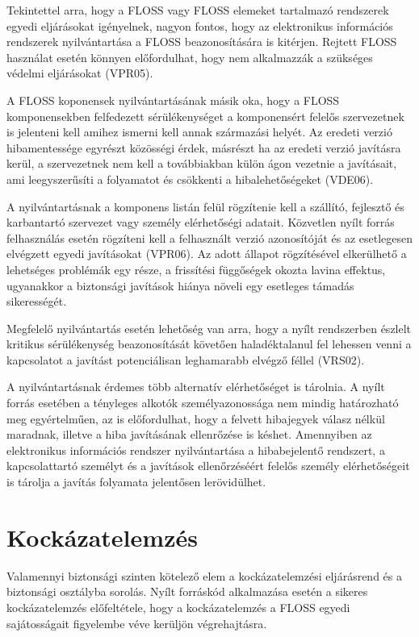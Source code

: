 \documentclass[12pt,magyar,a4paper,oneside]{scrreprt}
\begin{document}
Tekintettel arra, hogy a FLOSS vagy FLOSS elemeket tartalmazó rendszerek
egyedi eljárásokat igényelnek, nagyon fontos, hogy az elektronikus
információs rendszerek nyilvántartása a FLOSS beazonosítására is
kitérjen. Rejtett FLOSS használat esetén könnyen előfordulhat, hogy nem
alkalmazzák a szükséges védelmi eljárásokat (VPR05).

A FLOSS koponensek nyilvántartásának másik oka, hogy a FLOSS
komponensekben felfedezett sérülékenységet a komponensért felelős
szervezetnek is jelenteni kell amihez ismerni kell annak származási
helyét. Az eredeti verzió hibamentessége egyrészt közösségi érdek,
másrészt ha az eredeti verzió javításra kerül, a szervezetnek nem kell a
továbbiakban külön ágon vezetnie a javításait, ami leegyszerűsíti a
folyamatot és csökkenti a hibalehetőségeket (VDE06).

A nyilvántartásnak a komponens listán felül rögzítenie kell a szállító,
fejlesztő és karbantartó szervezet vagy személy elérhetőségi adatait.
Közvetlen nyílt forrás felhasználás esetén rögzíteni kell a felhasznált
verzió azonosítóját és az esetlegesen elvégzett egyedi javításokat
(VPR06). Az adott állapot rögzítésével elkerülhető a lehetséges
problémák egy része, a frissítési függőségek okozta lavina effektus,
ugyanakkor a biztonsági javítások hiánya növeli egy esetleges támadás
sikerességét.

Megfelelő nyilvántartás esetén lehetőség van arra, hogy a nyílt
rendszerben észlelt kritikus sérülékenység beazonosítását követően
haladéktalanul fel lehessen venni a kapcsolatot a javítást potenciálisan
leghamarabb elvégző féllel (VRS02).

A nyilvántartásnak érdemes több alternatív elérhetőséget is tárolnia. A
nyílt forrás esetében a tényleges alkotók személyazonossága nem mindig
határozható meg egyértelműen, az is előfordulhat, hogy a felvett
hibajegyek válasz nélkül maradnak, illetve a hiba javításának
ellenrőzése is késhet. Amennyiben az elektronikus információs rendszer
nyilvántartása a hibabejelentő rendszert, a kapcsolattartó személyt és a
javítások ellenőrzéséért felelős személy elérhetőségeit is tárolja a
javítás folyamata jelentősen lerövidülhet.

\hypertarget{kockuxe1zatelemzuxe9s}{%
\section{Kockázatelemzés}\label{kockuxe1zatelemzuxe9s}}

Valamennyi biztonsági szinten kötelező elem a kockázatelemzési
eljárásrend és a biztonsági osztályba sorolás. Nyílt forráskód
alkalmazása esetén a sikeres kockázatelemzés előfeltétele, hogy a
kockázatelemzés a FLOSS egyedi sajátosságait figyelembe véve kerüljön
végrehajtásra.
\end{document}
